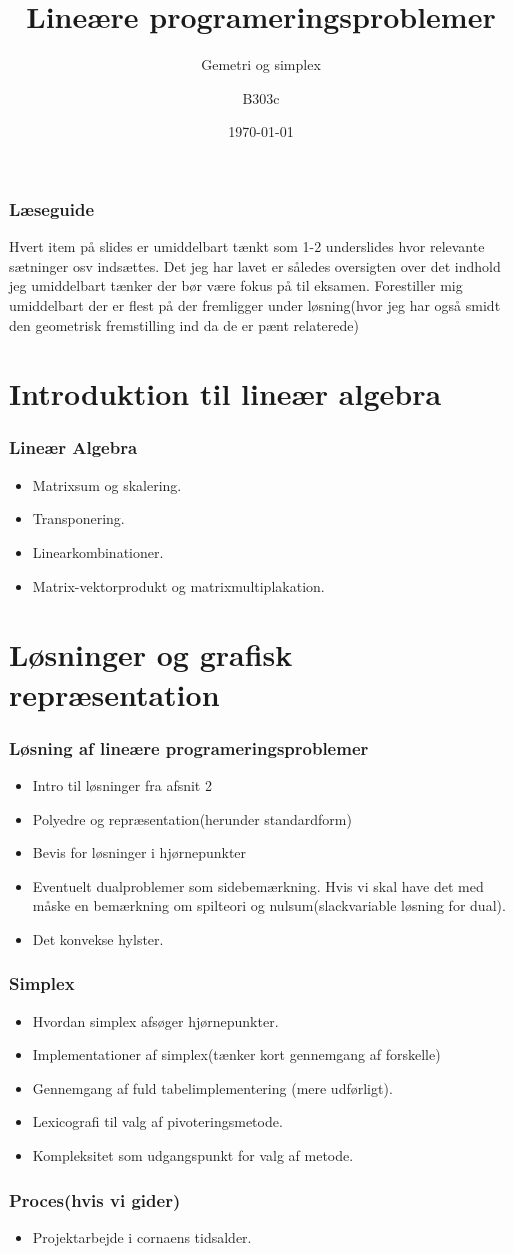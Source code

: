 \documentclass{beamer}
\title{Lineære programeringsproblemer}
\subtitle{Gemetri og simplex}
\author{B303c}
\institute{Aalborg Universitet}
\date{\today}
\begin{document}
\begin{frame}
\frametitle{Læseguide}
Hvert item på slides er umiddelbart tænkt som 1-2 underslides hvor relevante sætninger osv indsættes.
Det jeg har lavet er således oversigten over det indhold jeg umiddelbart tænker der bør være fokus på til eksamen.
Forestiller mig umiddelbart der er flest på der fremligger under løsning(hvor jeg har også smidt den geometrisk fremstilling ind da de er pænt relaterede)
\end{frame}

\section{Introduktion til lineær algebra}

\begin{frame}
\frametitle{Lineær Algebra}
\begin{itemize}
\item Matrixsum og skalering.
\item Transponering.
\item Linearkombinationer.
\item Matrix-vektorprodukt og matrixmultiplakation.
\end{itemize}
\end{frame}

\section{Løsninger og grafisk repræsentation}

\begin{frame}
\frametitle{Løsning af lineære programeringsproblemer}
\begin{itemize}
\item Intro til løsninger fra afsnit 2
\item Polyedre og repræsentation(herunder standardform)
\item Bevis for løsninger i hjørnepunkter
\item Eventuelt dualproblemer som sidebemærkning. Hvis vi skal have det med måske en bemærkning om spilteori og nulsum(slackvariable løsning for dual).
\item Det konvekse hylster.
\end{itemize}
\end{frame}


\begin{frame}
\frametitle{Simplex}
\begin{itemize}
\item Hvordan simplex afsøger hjørnepunkter.
\item Implementationer af simplex(tænker kort gennemgang af forskelle)
\item Gennemgang af fuld tabelimplementering (mere udførligt).
\item Lexicografi til valg af pivoteringsmetode.
\item Kompleksitet som udgangspunkt for valg af metode.
\end{itemize}
\end{frame}


\begin{frame}
\frametitle{Proces(hvis vi gider)}
\begin{itemize}
\item Projektarbejde i cornaens tidsalder.
\end{itemize}
\end{frame}
\end{document}

